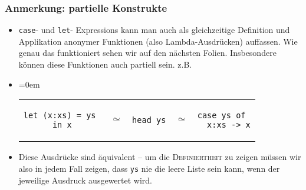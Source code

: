 \documentclass{beamer}
\begin{document}
\begin{frame}[fragile]
  \frametitle{Anmerkung: partielle Konstrukte}
  \begin{itemize}
  \item \texttt{case}- und \texttt{let}- Expressions kann man auch als gleichzeitige Definition und Applikation anonymer Funktionen (also Lambda-Ausdrücken) auffassen. Wie genau das funktioniert sehen wir auf den nächsten Folien. Insbesondere können diese Funktionen auch partiell sein. z.B.
  \item
    \arraycolsep=0em
    \begin{tabular}{ccccc}
    \begin{minipage}{3cm}
\begin{Verbatim}
let (x:xs) = ys 
in x
\end{Verbatim}
    \end{minipage}&
    \(\simeq\)&
    \begin{minipage}{1.5cm}
\begin{Verbatim}
head ys
\end{Verbatim}
    \end{minipage}&
      \(\simeq\)&
    \begin{minipage}{3cm}
\begin{Verbatim}
case ys of 
  x:xs -> x
\end{Verbatim}
    \end{minipage}
    \end{tabular}

  \item Diese Ausdrücke sind äquivalent -- um die \textsc{Definiertheit} zu zeigen müssen wir also in jedem Fall zeigen, dass \texttt{ys} nie die leere Liste sein kann, wenn der jeweilige Ausdruck ausgewertet wird.
  \end{itemize}
\end{frame}
\end{document}
